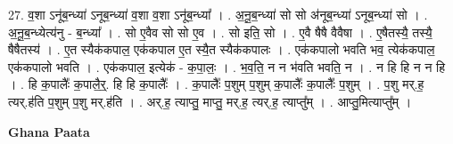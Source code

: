 \documentclass[17pt]{extarticle}
\begin{document}
27. व॒शा ऽनू॑ब॒न्ध्या॑ ऽनूब॒न्ध्या॑ व॒शा व॒शा ऽनू॑ब॒न्ध्या᳚ । . अ॒नू॒ब॒न्ध्या॑ सो सो अ॑नूब॒न्ध्या॑ ऽनूब॒न्ध्या॑ सो । . अ॒नू॒ब॒न्ध्येत्य॑नु - ब॒न्ध्या᳚ । . सो ए॒वैव सो सो ए॒व । . सो इति॒ सो । . ए॒वै षैषै वैवैषा । . ए॒षैतस्यै॒ तस्यै॒ षैषैतस्य॑ । . ए॒त स्यैक॑कपाल॒ एक॑कपाल ए॒त स्यै॒त स्यैक॑कपालः । . एक॑कपालो भवति भव॒ त्येक॑कपाल॒ एक॑कपालो भवति । . एक॑कपाल॒ इत्येक॑ - क॒पा॒लः॒ । . भ॒व॒ति॒ न न भ॑वति भवति॒ न । . न हि हि न न हि । . हि क॒पालैः᳚ क॒पालै॒र्॒. हि हि क॒पालैः᳚ । . क॒पालैः᳚ प॒शुम् प॒शुम् क॒पालैः᳚ क॒पालैः᳚ प॒शुम् । . प॒शु मर्.ह॒ त्यर्.ह॑ति प॒शुम् प॒शु मर्.ह॑ति । . अर्.ह॒ त्याप्तु॒ माप्तु॒ मर्.ह॒ त्यर्.ह॒ त्याप्तु᳚म् । . आप्तु॒मित्याप्तु᳚म् । \newline

\textbf{Ghana Paata } \newline
\end{document}
